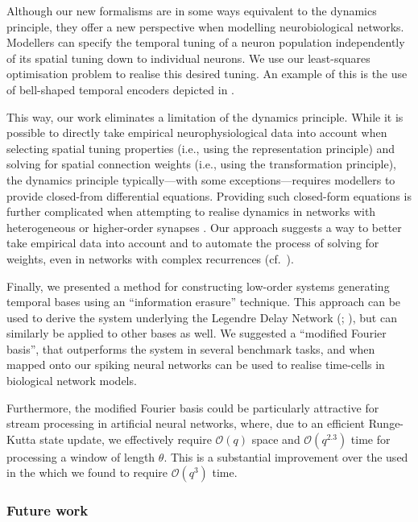 Although our new formalisms are in some ways equivalent to the \NEF dynamics principle, they offer a new perspective when modelling neurobiological networks.
Modellers can specify the temporal tuning of a neuron population independently of its spatial tuning down to individual neurons.
We use our least-squares optimisation problem to realise this desired tuning.
An example of this is the use of bell-shaped temporal encoders depicted in .

This way, our work eliminates a limitation of the \NEF dynamics principle.
While it is possible to directly take empirical neurophysiological data into account when selecting spatial tuning properties (i.e., using the representation principle) and solving for spatial connection weights (i.e., using the transformation principle), the dynamics principle typically---with some exceptions---requires modellers to provide closed-from differential equations.
Providing such closed-form equations is further complicated when attempting to realise dynamics in networks with heterogeneous or higher-order synapses \citep{voelker2018improving}.
Our approach suggests a way to better take empirical data into account and to automate the process of solving for weights, even in networks with complex recurrences (cf.~).

Finally, we presented a method for constructing low-order \LTI systems generating temporal bases using an \enquote{information erasure} technique.
This approach can be used to derive the \LTI system underlying the Legendre Delay Network (\LDN; \cite{voelker2018improving}), but can similarly be applied to other bases as well.
We suggested a \enquote{modified Fourier basis}, that outperforms the \LDN system in several benchmark tasks, and when mapped onto our spiking neural networks can be used to realise time-cells in biological network models.

Furthermore, the modified Fourier basis could be particularly attractive for stream processing in artificial neural networks, where, due to an efficient Runge-Kutta state update, we effectively require $\mathcal{O}(q)$ space and $\mathcal{O}(q^{2.3})$ time for processing a window of length $\theta$.
This is a substantial improvement over the \LDN used in the \LMU which we found to require $\mathcal{O}(q^3)$ time.

\subsubsection{Future work}

